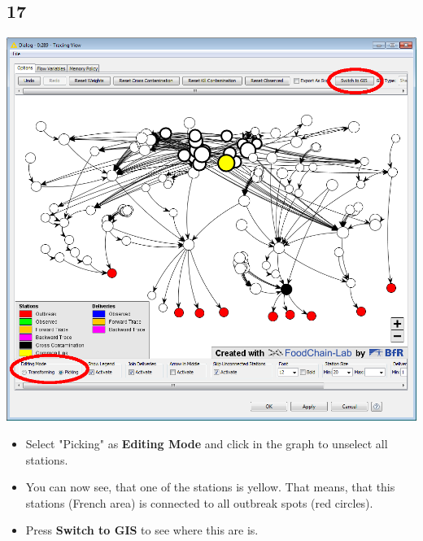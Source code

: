 \documentclass{beamer}
\begin{document}
\subsection{17}
\begin{frame}
	\begin{center}
  		\includegraphics[height=0.6\textheight]{17.png}
	\end{center}
	\begin{itemize}
		\item Select "Picking" as \textbf{Editing Mode} and click in the graph to unselect all stations.
		\item You can now see, that one of the stations is yellow. That means, that this stations (French area) is connected to all outbreak spots (red circles).
		\item Press \textbf{Switch to GIS} to see where this are is.
	\end{itemize}
\end{frame}
\end{document}
